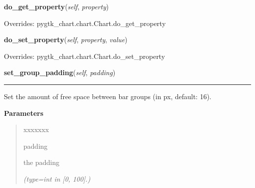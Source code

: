     \vspace{0.5ex}

\hspace{.8\funcindent}\begin{boxedminipage}{\funcwidth}

    \raggedright \textbf{do\_get\_property}(\textit{self}, \textit{property})

\setlength{\parskip}{2ex}
\setlength{\parskip}{1ex}
      Overrides: pygtk\_chart.chart.Chart.do\_get\_property

    \end{boxedminipage}

    \vspace{0.5ex}

\hspace{.8\funcindent}\begin{boxedminipage}{\funcwidth}

    \raggedright \textbf{do\_set\_property}(\textit{self}, \textit{property}, \textit{value})

\setlength{\parskip}{2ex}
\setlength{\parskip}{1ex}
      Overrides: pygtk\_chart.chart.Chart.do\_set\_property

    \end{boxedminipage}

    \label{pygtk_chart:multi_bar_chart:MultiBarChart:set_group_padding}

    \vspace{0.5ex}

\hspace{.8\funcindent}\begin{boxedminipage}{\funcwidth}

    \raggedright \textbf{set\_group\_padding}(\textit{self}, \textit{padding})

    \vspace{-1.5ex}

    \rule{\textwidth}{0.5\fboxrule}
\setlength{\parskip}{2ex}
    Set the amount of free space between bar groups (in px, default: 16).

\setlength{\parskip}{1ex}
      \textbf{Parameters}
      \vspace{-1ex}

      \begin{quote}
        \begin{Ventry}{xxxxxxx}

          \item[padding]

          the padding

            {\it (type=int in [0, 100].)}

        \end{Ventry}

      \end{quote}

    \end{boxedminipage}

